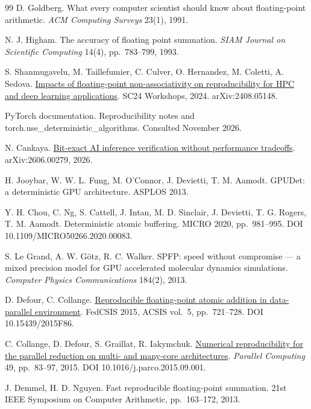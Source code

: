 \documentclass[journal]{IEEEtran}
\begin{document}
\begin{thebibliography}{99}
 D. Goldberg. What every computer scientist should know about
floating-point arithmetic. \emph{ACM Computing Surveys} 23(1), 1991.

 N. J. Higham. The accuracy of floating point summation. \emph{SIAM
Journal on Scientific Computing} 14(4), pp.~783--799, 1993.

 S. Shanmugavelu, M. Taillefumier, C. Culver, O. Hernandez, M. Coletti,
A. Sedova. \href{https://arxiv.org/pdf/2408.05148}{Impacts of
floating-point non-associativity on reproducibility for HPC and deep
learning applications}. SC24 Workshops, 2024. arXiv:2408.05148.

 PyTorch documentation. Reproducibility notes and
torch.use\_deterministic\_algorithms. Consulted November 2026.

 N. Cankaya. \href{https://arxiv.org/html/2606.00279v2}{Bit-exact AI
inference verification without performance tradeoffs}. arXiv:2606.00279,
2026.

 H. Jooybar, W. W. L. Fung, M. O'Connor, J. Devietti, T. M. Aamodt.
GPUDet: a deterministic GPU architecture. ASPLOS 2013.

 Y. H. Chou, C. Ng, S. Cattell, J. Intan, M. D. Sinclair, J. Devietti, T.
G. Rogers, T. M. Aamodt. Deterministic atomic buffering. MICRO 2020,
pp.~981--995. DOI 10.1109/MICRO50266.2020.00083.

 S. Le Grand, A. W. Götz, R. C. Walker. SPFP: speed without compromise
--- a mixed precision model for GPU accelerated molecular dynamics
simulations. \emph{Computer Physics Communications} 184(2), 2013.

 D. Defour, C. Collange.
\href{https://annals-csis.org/proceedings/2015/drp/86.html}{Reproducible
floating-point atomic addition in data-parallel environment}. FedCSIS
2015, ACSIS vol.~5, pp.~721--728. DOI 10.15439/2015F86.

 C. Collange, D. Defour, S. Graillat, R. Iakymchuk.
\href{https://hal-lirmm.ccsd.cnrs.fr/lirmm-01206348/document}{Numerical
reproducibility for the parallel reduction on multi- and many-core
architectures}. \emph{Parallel Computing} 49, pp.~83--97, 2015. DOI
10.1016/j.parco.2015.09.001.

 J. Demmel, H. D. Nguyen. Fast reproducible floating-point summation.
21st IEEE Symposium on Computer Arithmetic, pp.~163--172, 2013.


\end{thebibliography}
\end{document}
